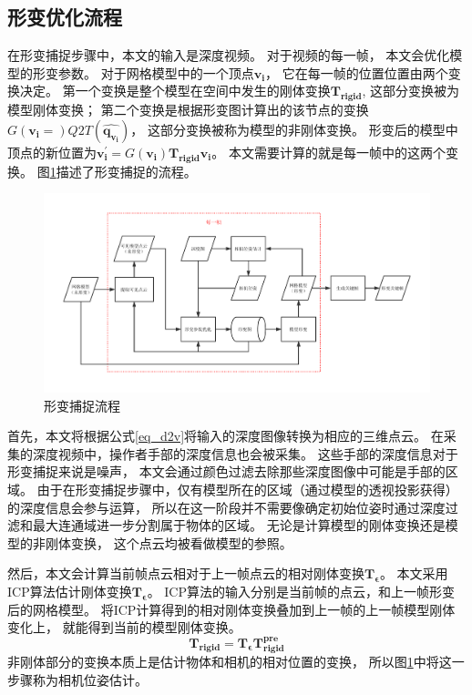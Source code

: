 \subsection{形变优化流程}
在形变捕捉步骤中，本文的输入是深度视频。
对于视频的每一帧，
本文会优化模型的形变参数。
对于网格模型中的一个顶点$\bm{v_i}$，
它在每一帧的位置位置由两个变换决定。
第一个变换是整个模型在空间中发生的刚体变换$\bm{T_{rigid}}$,
这部分变换被为模型刚体变换；
第二个变换是根据形变图计算出的该节点的变换$G(\bm{v_i}=)Q2T(\hat{\bm{q_{v_i}}})$，
这部分变换被称为模型的非刚体变换。
形变后的模型中顶点的新位置为$\bm{v_i^{'}}=G(\bm{v_i})\bm{T_{rigid}}\bm{v_i}$。
本文需要计算的就是每一帧中的这两个变换。
图\ref{deformation_sampling}描述了形变捕捉的流程。
\begin{figure}
    \centering
    \includegraphics[width = \textwidth]{./Pictures/ds_pipeline_cropped.pdf}
    \caption{形变捕捉流程}
    \label{deformation_sampling}
\end{figure}
首先，本文将根据公式\ref{eq_d2v}将输入的深度图像转换为相应的三维点云。
在采集的深度视频中，操作者手部的深度信息也会被采集。
这些手部的深度信息对于形变捕捉来说是噪声，
本文会通过颜色过滤去除那些深度图像中可能是手部的区域。
由于在形变捕捉步骤中，仅有模型所在的区域（通过模型的透视投影获得）的深度信息会参与运算，
所以在这一阶段并不需要像确定初始位姿时通过深度过滤和最大连通域进一步分割属于物体的区域。
无论是计算模型的刚体变换还是模型的非刚体变换，
这个点云均被看做模型的参照。

然后，本文会计算当前帧点云相对于上一帧点云的相对刚体变换$\bm{T_{\epsilon }}$。
本文采用ICP算法估计刚体变换$\bm{T_{\epsilon }}$。
ICP算法的输入分别是当前帧的点云，和上一帧形变后的网格模型。 
将ICP计算得到的相对刚体变换叠加到上一帧的上一帧模型刚体变化上，
就能得到当前的模型刚体变换。
\begin{equation}
    \bm{T_{rigid}}=\bm{T_{\epsilon}}\bm{T_{rigid}^{pre}}
\end{equation}
非刚体部分的变换本质上是估计物体和相机的相对位置的变换，
所以图\ref{deformation_sampling}中将这一步骤称为相机位姿估计。

